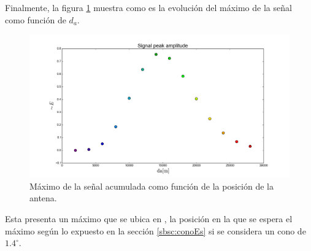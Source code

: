 	Finalmente, la figura \ref{fig:timeDelay_spa} muestra como es la evolución del máximo de la señal como función de $d_a$.	
	\begin{figure}[ht!]
		\centering
		\includegraphics[width=\textwidth]{./fig/EASRadio/timeDelay_spa}
		\caption{\label{fig:timeDelay_spa}
		M\'aximo de la se\~nal acumulada como función de la posici\'on de la antena.
		}
	\end{figure}
	Esta presenta un máximo que se ubica en , la posición en la que se espera el máximo según lo expuesto en la sección \ref{sbsc:conoEs} si se considera un cono \cher{} de $1.4^\circ$.
	